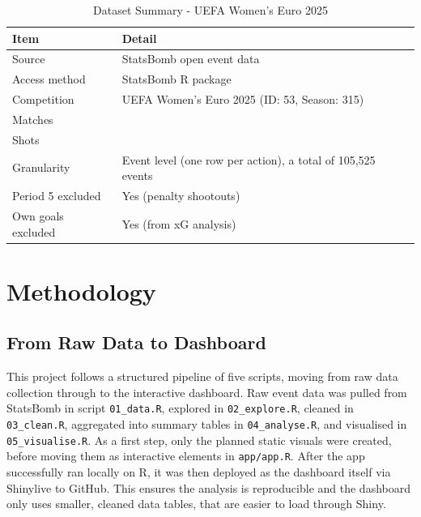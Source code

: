 \documentclass[
  11pt,
  a4paper,
  DIV=11,
  numbers=noendperiod]{scrartcl}
\begin{document}
\begin{longtable}[]{@{}
  >{\raggedright\arraybackslash}p{}
  >{\raggedright\arraybackslash}p{}@{}}

\caption{\label{tbl-data-summary}Dataset Summary - UEFA Women's Euro
2025}

\tabularnewline

\toprule\noalign{}
\begin{minipage}[b]{\linewidth}\raggedright
Item
\end{minipage} & \begin{minipage}[b]{\linewidth}\raggedright
Detail
\end{minipage} \\
\midrule\noalign{}
\endhead
\bottomrule\noalign{}
\endlastfoot
Source & StatsBomb open event data \\
Access method & StatsBomb R package \\
Competition & UEFA Women's Euro 2025 (ID: 53, Season: 315) \\
Matches & 31 \\
Shots & 875 \\
Granularity & Event level (one row per action), a total of 105,525
events \\
Period 5 excluded & Yes (penalty shootouts) \\
Own goals excluded & Yes (from xG analysis) \\

\end{longtable}

\section{Methodology}\label{methodology}

\subsection{From Raw Data to
Dashboard}\label{from-raw-data-to-dashboard}

This project follows a structured pipeline of five scripts, moving from
raw data collection through to the interactive dashboard. Raw event data
was pulled from StatsBomb in script \texttt{01\_data.R}, explored in
\texttt{02\_explore.R}, cleaned in \texttt{03\_clean.R}, aggregated into
summary tables in \texttt{04\_analyse.R}, and visualised in
\texttt{05\_visualise.R}. As a first step, only the planned static
visuals were created, before moving them as interactive elements in
\texttt{app/app.R}. After the app successfully ran locally on R, it was
then deployed as the dashboard itself via Shinylive to GitHub. This
ensures the analysis is reproducible and the dashboard only uses
smaller, cleaned data tables, that are easier to load through Shiny.
\end{document}
